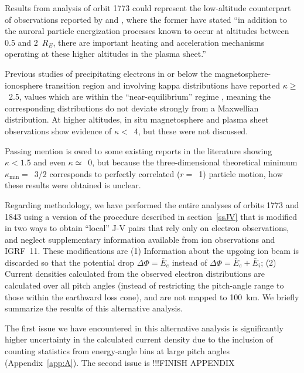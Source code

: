   Results from analysis of orbit 1773 could represent the low-altitude
  counterpart of observations reported by \citet{Wygant2002} and
  \citet{Schriver2003}, where the former have stated ``in addition to the
  auroral particle energization processes known to occur at altitudes between
  0.5 and 2~$R_E$, there are important heating and acceleration mechanisms
  operating at these higher altitudes in the plasma sheet.''

  Previous studies of precipitating electrons in or below the
  magnetosphere-ionosphere transition region and involving kappa distributions
  \citep{Olsson1998,Ogasawara2006,Kaeppler2014a} have reported $\kappa
  \geq$~2.5, values which are within the ``near-equilibrium'' regime
  \citep{Livadiotis2010}, meaning the corresponding distributions do not deviate
  strongly from a Maxwellian distribution. At higher altitudes, in situ
  magnetosphere and plasma sheet observations
  \citet{Christon1989,Christon1991,Kletzing2003} show evidence of $\kappa <$~4,
  but these were not discussed.

  Passing mention is owed to some existing reports in the literature showing
  $\kappa < 1.5$ and even $\kappa \simeq$~0, but because the three-dimensional
  theoretical minimum $\kappa_{\mathrm{min}} =$~3/2 corresponds to perfectly
  correlated ($r =$~1) particle motion, how these results were obtained is
  unclear.

  Regarding methodology, we have performed the entire analyses of orbits 1773
  and 1843 using a version of the procedure described in section~\ref{ssJV} that
  is modified in two ways to obtain ``local'' J-V pairs that rely only on
  electron observations, and neglect supplementary information available from
  ion observations and IGRF~11. These modifications are (1) Information about
  the upgoing ion beam is discarded so that the potential drop
  $\Delta \Phi = \bar{E}_e$ instead of $\Delta \Phi = \bar{E}_e + \bar{E}_i$;
  (2) Current densities calculated from the observed electron distributions are
  calculated over all pitch angles (instead of restricting the pitch-angle range
  to those within the earthward loss cone), and are not mapped to 100~km. We
  briefly summarize the results of this alternative analysis.

  The first issue we have encountered in this alternative analysis is 
  significantly higher uncertainty in the calculated current density due to the
  inclusion of counting statistics from energy-angle bins at large pitch angles
  (Appendix~\ref{app:A}). The second issue is
  !!!FINISH APPENDIX

